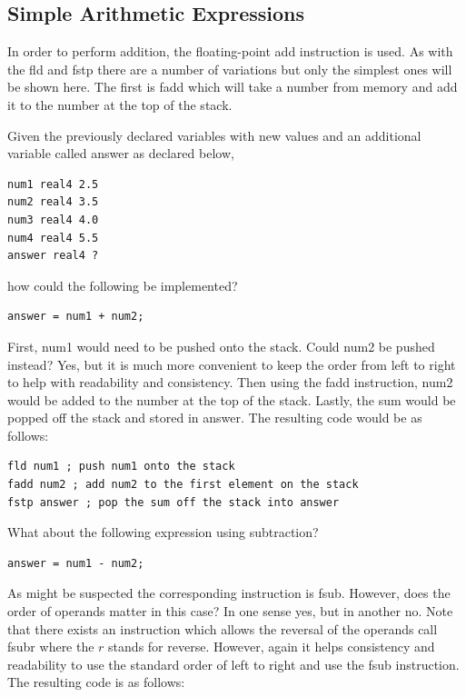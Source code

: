 \documentclass[10pt]{book}
\begin{document}
\subsection{Simple Arithmetic Expressions}
In order to perform addition, the floating-point add instruction is used. As with the fld and fstp there are a number of variations but only the simplest ones will be shown here. The first is fadd which will take a number from memory and add it to the number at the top of the stack.

Given the previously declared variables with new values and an additional variable called answer as declared below,

\begin{verbatim}
num1 real4 2.5
num2 real4 3.5
num3 real4 4.0
num4 real4 5.5
answer real4 ?
\end{verbatim}

how could the following be implemented?


\begin{verbatim}
answer = num1 + num2;
\end{verbatim}

First, num1 would need to be pushed onto the stack. Could num2 be pushed instead? Yes, but it is much more convenient to keep the order from left to right to help with readability and consistency. Then using the fadd instruction, num2 would be added to the number at the top of the stack. Lastly, the sum would be popped off the stack and stored in answer. The resulting code would be as follows:

\begin{verbatim}
fld num1 ; push num1 onto the stack
fadd num2 ; add num2 to the first element on the stack
fstp answer ; pop the sum off the stack into answer
\end{verbatim}

What about the following expression using subtraction?

\begin{verbatim}
answer = num1 - num2;
\end{verbatim}

As might be suspected the corresponding instruction is fsub. However, does the order of operands matter in this case? In one sense yes, but in another no. Note that there exists an instruction which allows the reversal of the operands call fsubr where the $r$ stands for reverse. However, again it helps consistency and readability to use the standard order of left to right and use the fsub instruction. The resulting code is as follows:
\end{document}
